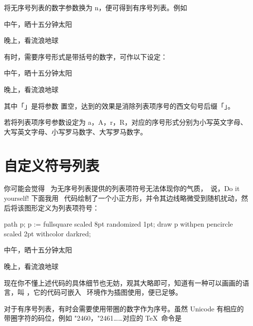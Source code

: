 将无序号列表的数字参数换为 n，便可得到有序号列表。例如

\startsamplecode\startnarrowtyping
\startitemize[n]
\item 中午，晒十五分钟太阳
\item 晚上，看流浪地球 \Romannumerals[2]
\stopitemize
\stopnarrowtyping\stopsamplecode
{}

有时，需要序号形式是带括号的数字，可作以下设定：

\startsamplecode\startnarrowtyping
\startitemize[n][left=(,right=),stopper=]
\item 中午，晒十五分钟太阳
\item 晚上，看流浪地球 \Romannumerals[2]
\stopitemize
\stopnarrowtyping\stopsamplecode
{}

\noindent 其中「」是将参数  置空，达到的效果是消除列表项序号的西文句号后缀「」。

若将列表项序号参数设定为 a，A，r，R，对应的序号形式分别为小写英文字母、大写英文字母、小写罗马数字、大写罗马数字。

\section[item-sym-diy]{自定义符号列表}

你可能会觉得 \ConTeXt\ 为无序号列表提供的列表项符号无法体现你的气质，\ConTeXt\ 说，Do it yourself! 下面我用 \METAPOST\ 代码绘制了一个小正方形，并令其边线略微受到随机扰动，然后将该图形定义为列表项符号：

\startsamplecode\startnarrowtyping
{}
  path p;
  p := fullsquare scaled 8pt randomized 1pt;
  draw p withpen pencircle scaled 2pt
         withcolor darkred;
\stopuseMPgraphic

\startitemize[10]
\item 中午，晒十五分钟太阳
\item 晚上，看流浪地球 
\stopitemize
\stopnarrowtyping\stopsamplecode
{}

\noindent 现在你不懂上述代码的具体细节也无妨，观其大略即可，知道有一种可以画画的语言，叫 \METAPOST，它的代码可嵌入 \ConTeXt\ 环境作为插图使用，便已足够。

对于有序号列表，有时会需要使用带圈的数字作为序号。虽然 Unicode 有相应的带圈字符的码位，例如 \char"2460，\char"2461……对应的 \TeX\ 命令是

